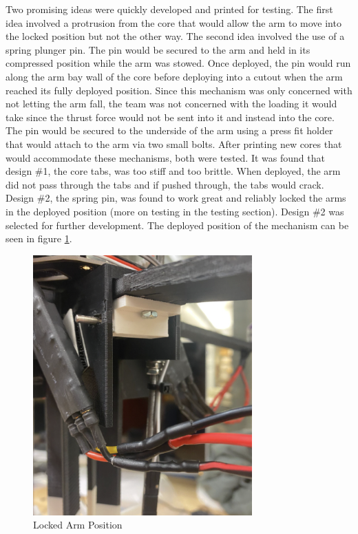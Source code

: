 Two promising ideas were quickly developed and printed for testing. The first idea involved a protrusion from the core that would allow the arm to move into the locked position but not the other way. The second idea involved the use of a spring plunger pin. The pin would be secured to the arm and held in its compressed position while the arm was stowed. Once deployed, the pin would run along the arm bay wall of the core before deploying into a cutout when the arm reached its fully deployed position. Since this mechanism was only concerned with not letting the arm fall, the team was not concerned with the loading it would take since the thrust force would not be sent into it and instead into the core. The pin would be secured to the underside of the arm using a press fit holder that would attach to the arm via two small bolts. After printing new cores that would accommodate these mechanisms, both were tested. It was found that design \#1, the core tabs, was too stiff and too brittle. When deployed, the arm did not pass through the tabs and if pushed through, the tabs would crack. Design \#2, the spring pin, was found to work great and reliably locked the arms in the deployed position (more on testing in the testing section). Design \#2 was selected for further development. The deployed position of the mechanism can be seen in figure \ref{fig:armlocked}.

\begin{figure}[H]
    \centering
    \includegraphics[width=0.75\textwidth]{src/figs/deployedarmimageview3.png}
    \caption{Locked Arm Position}
    \label{fig:armlocked}
\end{figure}



